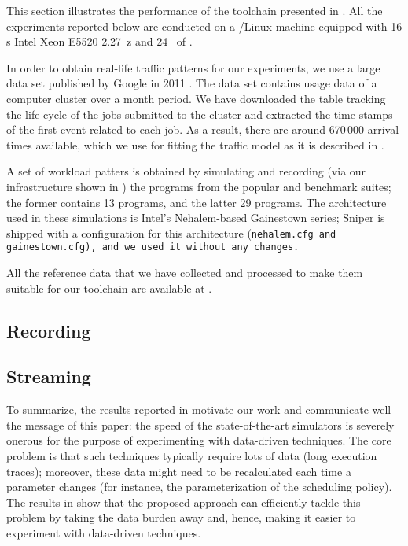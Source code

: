 This section illustrates the performance of the toolchain presented in
. All the experiments reported below are conducted on a
/Linux machine equipped with 16 s Intel Xeon E5520 2.27~z
and 24~ of .

In order to obtain real-life traffic patterns for our experiments, we use a
large data set published by Google in 2011 \cite{reiss2011}. The data set
contains usage data of a computer cluster over a month period. We have
downloaded the table tracking the life cycle of the jobs submitted to the
cluster and extracted the time stamps of the first event related to each job. As
a result, there are around 670\,000 arrival times available, which we use for
fitting the traffic model as it is described in .

A set of workload patters is obtained by simulating and recording (via our
infrastructure shown in ) the programs from the popular
 \cite{bienia2011} and  \cite{cpu2006} benchmark
suites; the former contains 13 programs, and the latter 29 programs. The
architecture used in these simulations is Intel's Nehalem-based Gainestown
series; Sniper is shipped with a configuration for this architecture
(\tt{nehalem.cfg} and \tt{gainestown.cfg}), and we used it without any changes.

All the reference data that we have collected and processed to make them
suitable for our toolchain are available at \cite{sources}.

\subsection{Recording}


\subsection{Streaming}


To summarize, the results reported in  motivate our work and
communicate well the message of this paper: the speed of the state-of-the-art
simulators is severely onerous for the purpose of experimenting with data-driven
techniques. The core problem is that such techniques typically require lots of
data (long execution traces); moreover, these data might need to be recalculated
each time a parameter changes (for instance, the parameterization of the
scheduling policy). The results in  show that the proposed
approach can efficiently tackle this problem by taking the data burden away and,
hence, making it easier to experiment with data-driven techniques.
